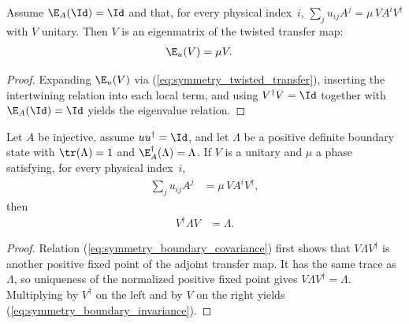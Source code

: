 \begin{lemma}%
    \label{thm:twisted_transfer_eigen_of_virtual_unitary}
    \leanok
    Assume $\E_A(\Id)=\Id$ and that, for every physical index~$i$,
    $\sum_j u_{ij} A^j = \mu\, V A^i V^\dagger$ with $V$ unitary.
    Then $V$ is an eigenmatrix of the twisted transfer map:
    \begin{align}
        \E_u(V) & = \mu V.
        \label{eq:symmetry_virtual_eigenmatrix}
    \end{align}
\end{lemma}

\begin{proof}
    \leanok
    Expanding $\E_u(V)$ via (\ref{eq:symmetry_twisted_transfer}), inserting the
    intertwining relation into each local term, and using
    $V^\dagger V = \Id$ together with $\E_A(\Id)=\Id$ yields the eigenvalue
    relation.
\end{proof}

\begin{lemma}%
    \label{thm:boundary_state_invariant_of_virtual_unitary}
    \leanok
    Let $A$ be injective, assume $u u^\dagger = \Id$, and let $\Lambda$ be a
    positive definite boundary state with $\tr(\Lambda)=1$ and
    $\E_A^\dagger(\Lambda)=\Lambda$.
    If $V$ is a unitary and $\mu$ a phase satisfying, for every physical
    index~$i$,
    \begin{align}
        \sum_j u_{ij} A^j
         & = \mu\, V A^i V^\dagger,
        \label{eq:symmetry_boundary_covariance}
    \end{align}
    then
    \begin{align}
        V^\dagger \Lambda V & = \Lambda.
        \label{eq:symmetry_boundary_invariance}
    \end{align}
\end{lemma}

\begin{proof}
    \leanok
    Relation (\ref{eq:symmetry_boundary_covariance}) first shows that
    $V\Lambda V^\dagger$ is another positive fixed point of the adjoint
    transfer map.  It has the same trace as $\Lambda$, so uniqueness of the
    normalized positive fixed point gives
    $V\Lambda V^\dagger=\Lambda$.  Multiplying by $V^\dagger$ on the left
    and by $V$ on the right yields
    (\ref{eq:symmetry_boundary_invariance}).
\end{proof}

